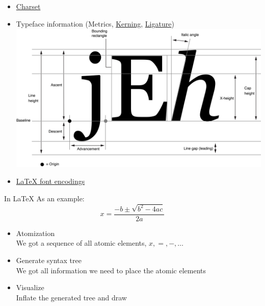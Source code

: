 \documentclass[10pt]{beamer}
\begin{document}
\begin{CJK*}{UTF8}{gbsn}
\section{}
    \subsection{}
    \subsection{}
\begin{frame}
\frametitle{}
\begin{itemize}
    \item \href{http://www.unicode-table.com/}{Charset}
    \item Typeface information (Metrics, \href{http://en.wikipedia.org/wiki/Kerning}{Kerning}, \href{http://en.wikipedia.org/wiki/Typographic_ligature}{Ligature}) \\
        \includegraphics[scale=.16]{glyph_metrics.png}
    \item \href{http://www.tug.org/texlive//devsrc/Master/texmf-dist/doc/latex/base/encguide.pdf}{{\LaTeX } font encodings}
\end{itemize}
\end{frame}
\begin{frame}{}
In {\LaTeX } \text{[$ x=\backslash frac\{-b\backslash pm \backslash sqrt \{ b \wedge 2-4ac \} \} \{ 2a \} $]} As an example:
$$x=\frac{-b\pm\sqrt{b^2-4ac}}{2a}$$
\begin{itemize}
    \item Atomization\\
    We got a sequence of all atomic elements, {$x, =, -, \ldots$}
    \item Generate syntax tree\\
    We got all information we need to place the atomic elements
    \item Visualize\\
    Inflate the generated tree and draw
\end{itemize}
\end{frame}


\end{CJK*}
\end{document}
